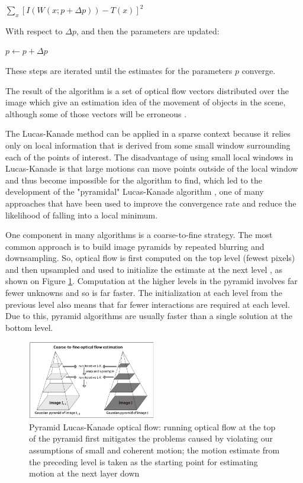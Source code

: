 \documentclass[msc, a4paper, classic, en]{ufbathesis}
\begin{document}
\begin{center}
  $\sum_{x}{[I(W(x;p + \Delta{p}))-T(x)]^2}$
\end{center}

With respect to $\Delta{p}$, and then the parameters are updated:

\begin{center}
  $p \gets p + \Delta{p}$
\end{center}

These steps are iterated until the estimates for the parameters $p$ converge.

The result of the algorithm is a set of optical flow vectors distributed over the image which give an estimation idea of the movement of objects in the scene, although some of those vectors will be erroneous \cite{raul}.

The Lucas-Kanade method can be applied in a sparse context because it relies only on local information that is derived from some small window surrounding each of the points of interest. The disadvantage of using small local windows in Lucas-Kanade is that large motions can move points outside of the local window and thus become impossible for the algorithm to find, which led to the development of the "pyramidal" Lucas-Kanade algorithm \cite{Bouguet00}, one of many approaches that have been used to improve the convergence rate and reduce the likelihood of falling into a local minimum.

One component in many algorithms is a coarse-to-fine strategy. The most common approach is to build image pyramids by repeated blurring and downsampling. So, optical flow is first computed on the top level (fewest pixels) and then upsampled and used to initialize the estimate at the next level \cite{dblk}, as shown on Figure \ref{fig:plk}. Computation at the higher levels in the pyramid involves far fewer unknowns and so is far faster. The initialization at each level from the previous level also means that far fewer interactions are required at each level. Due to this, pyramid algorithms are usually faster than a single solution at the bottom level.

\begin{figure}
\label{fig:plk}
\centering
\includegraphics[width=0.5\textwidth]{images/plk.png}
\caption{Pyramid Lucas-Kanade optical flow: running optical flow at the top of the pyramid first
mitigates the problems caused by violating our assumptions of small and coherent motion; the motion estimate from the preceding level is taken as the starting point for estimating motion at the next layer down \cite{bradski2008learning}}
\end{figure}
\end{document}
